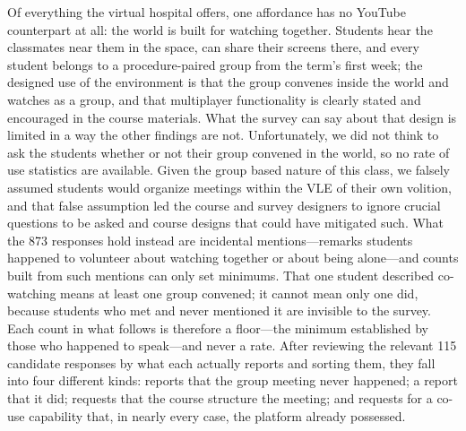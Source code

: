 
Of everything the virtual hospital offers, one affordance has no YouTube
counterpart at all: the world is built for watching together. Students
hear the classmates near them in the space, can share their screens
there, and every student belongs to a procedure-paired group from the
term's first week; the designed use of the environment is that the
group convenes inside the world and watches as a group, and that
multiplayer functionality is clearly stated and encouraged in the
course materials. What the survey can say about that design is limited
in a way the other findings are not. Unfortunately, we did not think to
ask the students whether or not their group convened in the world, so
no rate of use statistics are available. Given the group based nature
of this class, we falsely assumed students would organize meetings
within the VLE of their own volition, and that false assumption led the
course and survey designers to ignore crucial questions to be asked and
course designs that could have mitigated such. What the 873 responses
hold instead are incidental mentions---remarks students happened to
volunteer about watching together or about being alone---and counts
built from such mentions can only set minimums. That one student
described co-watching means at least one group convened; it cannot mean
only one did, because students who met and never mentioned it are
invisible to the survey. Each count in what follows is therefore a
floor---the minimum established by those who happened to speak---and
never a rate. After reviewing the relevant 115 candidate responses by
what each actually reports and sorting them, they fall into four
different kinds: reports that the group meeting never happened; a
report that it did; requests that the course structure the meeting; and
requests for a co-use capability that, in nearly every case, the
platform already possessed.

